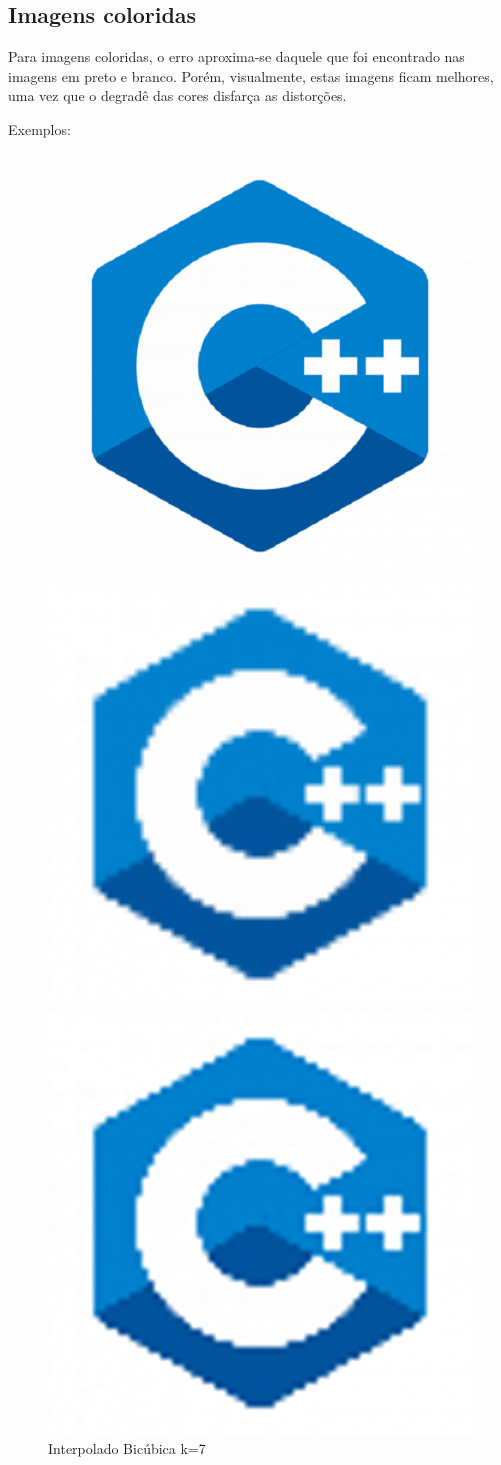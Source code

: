 \documentclass[12pt]{article}
\begin{document}
\subsection{Imagens coloridas}
Para imagens coloridas, o erro aproxima-se daquele que foi encontrado nas imagens em preto e branco. Porém, visualmente, estas imagens ficam melhores, uma vez que o degradê das cores disfarça as distorções.

Exemplos:
\begin{figure}[H]
  \centering
  \begin{minipage}{.5\textwidth}
    \centering
    \includegraphics[width=.4\linewidth]{imagens/img_cmaismais/cmaismais.png}
    \caption{Original}
  \end{minipage}
  \begin{minipage}{.5\linewidth}
  \end{minipage}
  \begin{minipage}{.5\textwidth}
    \centering
    \includegraphics[width=.4\linewidth]{imagens/img_cmaismais/cmaismais_1_7_1.png}
    \caption{Interpolado Bilinear k=7}
  \end{minipage}%
  \begin{minipage}{.5\textwidth}
    \centering
    \includegraphics[width=.4\linewidth]{imagens/img_cmaismais/cmaismais_2_7_1.png}
    \caption{Interpolado Bicúbica k=7}
  \end{minipage}
\end{figure}
\end{document}
